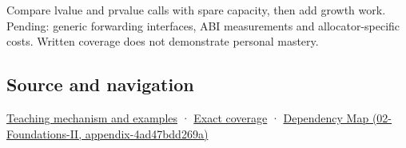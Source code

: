 Compare lvalue and prvalue calls with spare capacity, then add growth work. Pending: generic forwarding interfaces, ABI measurements and allocator-specific costs. Written coverage does not demonstrate personal mastery.

\subsection{Source and navigation}\label{appendix-d5908f75721f-source-and-navigation}

\hyperref[01-foundations-i-ch003-a-value-crosses-the-function-boundary]{Teaching mechanism and examples} · \hyperref[appendix-fd090d982a15-m009---parts-127-147]{Exact coverage} · \href{../02-Foundations-II/main.pdf\#nameddest=appendix-4ad47bdd269a}{Dependency Map (02-Foundations-II, appendix-4ad47bdd269a)}
